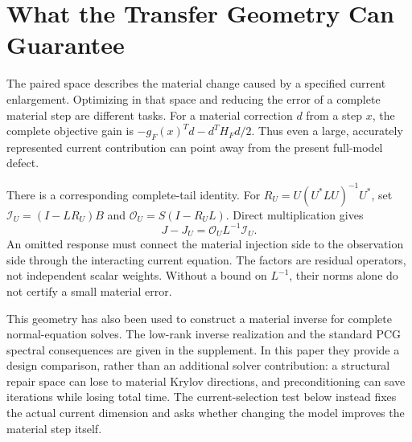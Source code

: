 \section{What the Transfer Geometry Can Guarantee}
The paired space describes the material change caused by a specified current enlargement. Optimizing in that space and reducing the error of a complete material step are different tasks. For a material correction $d$ from a step $x$, the complete objective gain is $-g_F(x)^Td-d^TH_Fd/2$. Thus even a large, accurately represented current contribution can point away from the present full-model defect.

There is a corresponding complete-tail identity. For $R_U=U(U^*LU)^{-1}U^*$, set $\mathcal I_U=(I-LR_U)B$ and $\mathcal O_U=S(I-R_UL)$. Direct multiplication gives
\[
 J-J_U=\mathcal O_U L^{-1}\mathcal I_U.
\]
An omitted response must connect the material injection side to the observation side through the interacting current equation. The factors are residual operators, not independent scalar weights. Without a bound on $L^{-1}$, their norms alone do not certify a small material error.

This geometry has also been used to construct a material inverse for complete normal-equation solves. The low-rank inverse realization and the standard PCG spectral consequences are given in the supplement. In this paper they provide a design comparison, rather than an additional solver contribution: a structural repair space can lose to material Krylov directions, and preconditioning can save iterations while losing total time. The current-selection test below instead fixes the actual current dimension and asks whether changing the model improves the material step itself.

